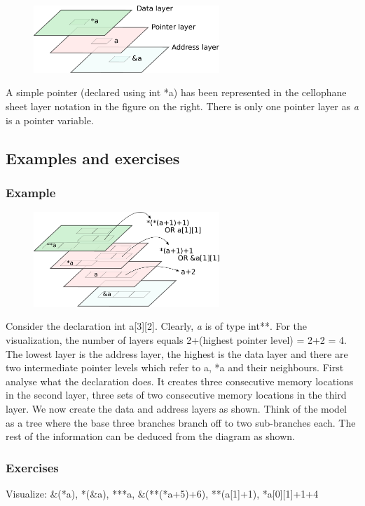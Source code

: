 \documentclass[10pt,twoside]{article}
\begin{document}
\begin{figure}
\includegraphics[width=70mm]{res/simple-pointer.pdf}
\end{figure}

A simple pointer (declared using int *a) has been represented in the cellophane
sheet layer notation in the figure on the right. There is only one pointer layer
as \textit{a} is a pointer variable.

\subsection*{Examples and exercises}
\subsubsection*{Example}

\begin{figure}
\includegraphics[width=70mm]{res/dual-ar.pdf}
\end{figure}

Consider the declaration int a[3][2]. Clearly, \textit{a }\textup{is of type
int**. For the visualization, the number of layers equals 2+(highest pointer
level) = 2+2 = 4. The lowest layer is the address layer, the highest is the data
layer and there are two intermediate pointer levels which refer to a, *a and
their neighbours.  First analyse what the declaration does. It creates three
consecutive memory locations in the second layer, three sets of two consecutive
memory locations in the third layer. We now create the data and address layers
as shown. Think of the model as a tree where the base three branches branch off
to two sub-branches each. The rest of the information can be deduced from the
diagram as shown.}

\subsubsection*{Exercises}
Visualize: \&(*a), *(\&a), ***a, \&(**(*a+5)+6), **(a[1]+1),
*a[0][1]+1+4
\newpage
\end{document}
